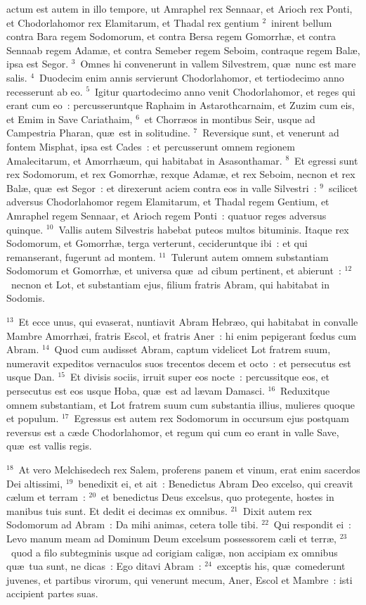 \bchapter
{}actum est autem in illo tempore, ut Amraphel rex Sennaar, et Arioch rex Ponti, et Chodorlahomor rex Elamitarum, et Thadal rex gentium
${}^{2}$~inirent bellum contra Bara regem Sodomorum, et contra Bersa regem Gomorrh\ae , et contra Sennaab regem Adam\ae , et contra Semeber regem Seboim, contraque regem Bal\ae , ipsa est Segor.
${}^{3}$~Omnes hi convenerunt in vallem Silvestrem, qu\ae\ nunc est mare salis.
${}^{4}$~Duodecim enim annis servierunt Chodorlahomor, et tertiodecimo anno recesserunt ab eo.
${}^{5}$~Igitur quartodecimo anno venit Chodorlahomor, et reges qui erant cum eo~: percusseruntque Raphaim in Astarothcarnaim, et Zuzim cum eis, et Emim in Save Cariathaim,
${}^{6}$~et Chorr\ae os in montibus Seir, usque ad Campestria Pharan, qu\ae\ est in solitudine.
${}^{7}$~Reversique sunt, et venerunt ad fontem Misphat, ipsa est Cades~: et percusserunt omnem regionem Amalecitarum, et Amorrh\ae um, qui habitabat in Asasonthamar.
${}^{8}$~Et egressi sunt rex Sodomorum, et rex Gomorrh\ae , rexque Adam\ae , et rex Seboim, necnon et rex Bal\ae , qu\ae\ est Segor~: et direxerunt aciem contra eos in valle Silvestri~:
${}^{9}$~scilicet adversus Chodorlahomor regem Elamitarum, et Thadal regem Gentium, et Amraphel regem Sennaar, et Arioch regem Ponti~: quatuor reges adversus quinque.
${}^{10}$~Vallis autem Silvestris habebat puteos multos bituminis. Itaque rex Sodomorum, et Gomorrh\ae , terga verterunt, cecideruntque ibi~: et qui remanserant, fugerunt ad montem.
${}^{11}$~Tulerunt autem omnem substantiam Sodomorum et Gomorrh\ae , et universa qu\ae\ ad cibum pertinent, et abierunt~:
${}^{12}$~necnon et Lot, et substantiam ejus, filium fratris Abram, qui habitabat in Sodomis.


${}^{13}$~Et ecce unus, qui evaserat, nuntiavit Abram Hebr\ae o, qui habitabat in convalle Mambre Amorrh\ae i, fratris Escol, et fratris Aner~: hi enim pepigerant fœdus cum Abram.
${}^{14}$~Quod cum audisset Abram, captum videlicet Lot fratrem suum, numeravit expeditos vernaculos suos trecentos decem et octo~: et persecutus est usque Dan.
${}^{15}$~Et divisis sociis, irruit super eos nocte~: percussitque eos, et persecutus est eos usque Hoba, qu\ae\ est ad l\ae vam Damasci.
${}^{16}$~Reduxitque omnem substantiam, et Lot fratrem suum cum substantia illius, mulieres quoque et populum.
${}^{17}$~Egressus est autem rex Sodomorum in occursum ejus postquam reversus est a c\ae de Chodorlahomor, et regum qui cum eo erant in valle Save, qu\ae\ est vallis regis.


${}^{18}$~At vero Melchisedech rex Salem, proferens panem et vinum, erat enim sacerdos Dei altissimi,
${}^{19}$~benedixit ei, et ait~: Benedictus Abram Deo excelso, qui creavit c\ae lum et terram~:
${}^{20}$~et benedictus Deus excelsus, quo protegente, hostes in manibus tuis sunt. Et dedit ei decimas ex omnibus.
${}^{21}$~Dixit autem rex Sodomorum ad Abram~: Da mihi animas, cetera tolle tibi.
${}^{22}$~Qui respondit ei~: Levo manum meam ad Dominum Deum excelsum possessorem c\ae li et terr\ae ,
${}^{23}$~quod a filo subtegminis usque ad corigiam calig\ae , non accipiam ex omnibus qu\ae\ tua sunt, ne dicas~: Ego ditavi Abram~:
${}^{24}$~exceptis his, qu\ae\ comederunt juvenes, et partibus virorum, qui venerunt mecum, Aner, Escol et Mambre~: isti accipient partes suas.

